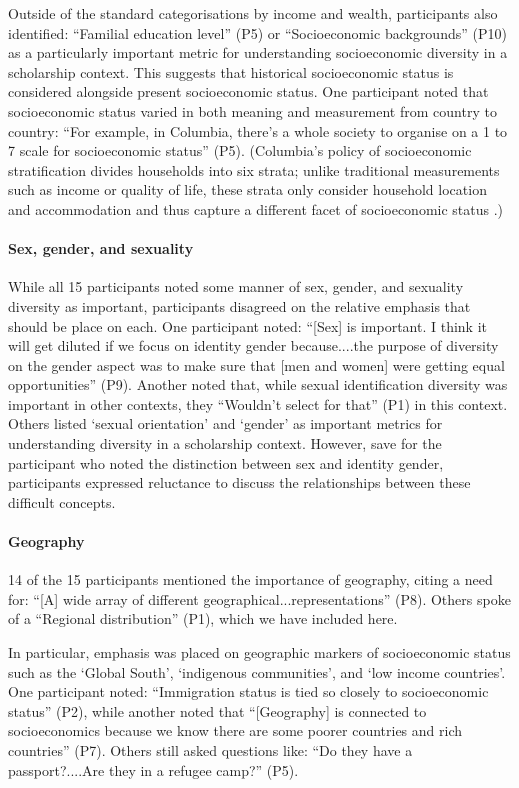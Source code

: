 Outside of the standard categorisations by income and wealth, participants also identified: ``Familial education level'' (P5) or ``Socioeconomic backgrounds'' (P10) as a particularly important metric for understanding socioeconomic diversity in a scholarship context. This suggests that historical socioeconomic status is considered alongside present socioeconomic status. One participant noted that socioeconomic status varied in both meaning and measurement from country to country: ``For example, in Columbia, there's a whole society to organise on a 1 to 7 scale for socioeconomic status'' (P5). (Columbia's policy of socioeconomic stratification divides households into six strata; unlike traditional measurements such as income or quality of life, these strata only consider household location and accommodation and thus capture a different facet of socioeconomic status \cite{CHICAOLMO2020102560}.)

\paragraph{Sex, gender, and sexuality}
While all 15 participants noted some manner of sex, gender, and sexuality diversity as important, participants disagreed on the relative emphasis that should be place on each. One participant noted: ``[Sex] is important. I think it will get diluted if we focus on identity gender because....the purpose of diversity on the gender aspect was to make sure that [men and women] were getting equal opportunities'' (P9). Another noted that, while sexual identification diversity was important in other contexts, they ``Wouldn't select for that'' (P1) in this context. Others listed `sexual orientation' and `gender' as important metrics for understanding diversity in a scholarship context. However, save for the participant who noted the distinction between sex and identity gender, participants expressed reluctance to discuss the relationships between these difficult concepts.

\paragraph{Geography}
14 of the 15 participants mentioned the importance of geography, citing a need for: ``[A] wide array of different geographical...representations'' (P8). Others spoke of a ``Regional distribution'' (P1), which we have included here.

In particular, emphasis was placed on geographic markers of socioeconomic status such as  the `Global South', `indigenous communities', and `low income countries'. One participant noted: ``Immigration status is tied so closely to socioeconomic status'' (P2), while another noted that ``[Geography] is connected to socioeconomics because we know there are some poorer countries and rich countries'' (P7). Others still asked questions like: ``Do they have a passport?....Are they in a refugee camp?'' (P5).

